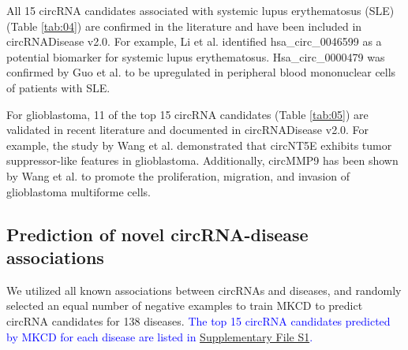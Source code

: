 \documentclass[journal=jcisd8,manuscript=article]{achemso}
\begin{document}
All 15 circRNA candidates associated with systemic lupus erythematosus (SLE) (Table \ref{tab:04}) are confirmed in the literature and have been included in circRNADisease v2.0. For example, Li et al. \cite{li2018comprehensive} identified hsa\_circ\_0046599 as a potential biomarker for systemic lupus erythematosus. Hsa\_circ\_0000479 was confirmed by Guo et al. \cite{guo2019hsa_circ_0000479} to be upregulated in peripheral blood mononuclear cells of patients with SLE.

For glioblastoma, 11 of the top 15 circRNA candidates (Table \ref{tab:05}) are validated in recent literature and documented in circRNADisease v2.0. For example, the study by Wang et al. \cite{wang2018circnt5e} demonstrated that circNT5E exhibits tumor suppressor-like features in glioblastoma. Additionally, circMMP9 has been shown by Wang et al. \cite{wang2018eif4a3} to promote the proliferation, migration, and invasion of glioblastoma multiforme cells.

\vspace{-0.5cm}

\subsection{Prediction of novel circRNA-disease associations}
\vspace{-0.3cm}
We utilized all known associations between circRNAs and diseases, and randomly selected an equal number of negative examples to train MKCD to predict circRNA candidates for 138 diseases. \textcolor{blue}{The top 15 circRNA candidates predicted by MKCD for each disease are listed in \href{https://github.com/pingxuan-hlju/MKCD}{Supplementary File S1}.}
\vspace{-0.5cm}
\end{document}
